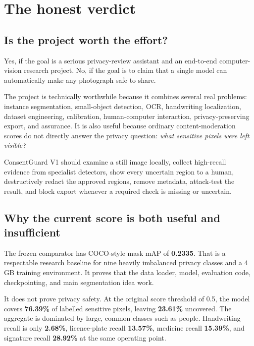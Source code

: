 \chapter{The honest verdict}

\section{Is the project worth the effort?}

Yes, if the goal is a serious privacy-review assistant and an end-to-end computer-vision research project. No, if the goal is to claim that a single model can automatically make any photograph safe to share.

The project is technically worthwhile because it combines several real problems: instance segmentation, small-object detection, OCR, handwriting localization, dataset engineering, calibration, human-computer interaction, privacy-preserving export, and assurance. It is also useful because ordinary content-moderation scores do not directly answer the privacy question: \emph{what sensitive pixels were left visible?}

\begin{truthbox}
ConsentGuard V1 should examine a still image locally, collect high-recall evidence from specialist detectors, show every uncertain region to a human, destructively redact the approved regions, remove metadata, attack-test the result, and block export whenever a required check is missing or uncertain.
\end{truthbox}

\section{Why the current score is both useful and insufficient}

The frozen comparator has COCO-style mask mAP of \textbf{0.2335}. That is a respectable research baseline for nine heavily imbalanced privacy classes and a 4 GB training environment. It proves that the data loader, model, evaluation code, checkpointing, and main segmentation idea work.

It does not prove privacy safety. At the original score threshold of 0.5, the model covers \textbf{76.39\%} of labelled sensitive pixels, leaving \textbf{23.61\%} uncovered. The aggregate is dominated by large, common classes such as people. Handwriting recall is only \textbf{2.68\%}, licence-plate recall \textbf{13.57\%}, medicine recall \textbf{15.39\%}, and signature recall \textbf{28.92\%} at the same operating point.

